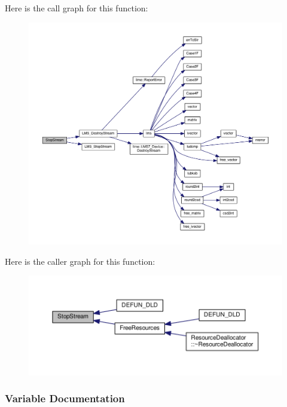 Here is the call graph for this function\+:
\nopagebreak
\begin{figure}[H]
\begin{center}
\leavevmode
\includegraphics[width=350pt]{db/d92/LimeSuite_8cc_ae9fa7397859788c89a68774cf5b4e1f6_cgraph}
\end{center}
\end{figure}




Here is the caller graph for this function\+:
\nopagebreak
\begin{figure}[H]
\begin{center}
\leavevmode
\includegraphics[width=350pt]{db/d92/LimeSuite_8cc_ae9fa7397859788c89a68774cf5b4e1f6_icgraph}
\end{center}
\end{figure}




\subsubsection{Variable Documentation}
